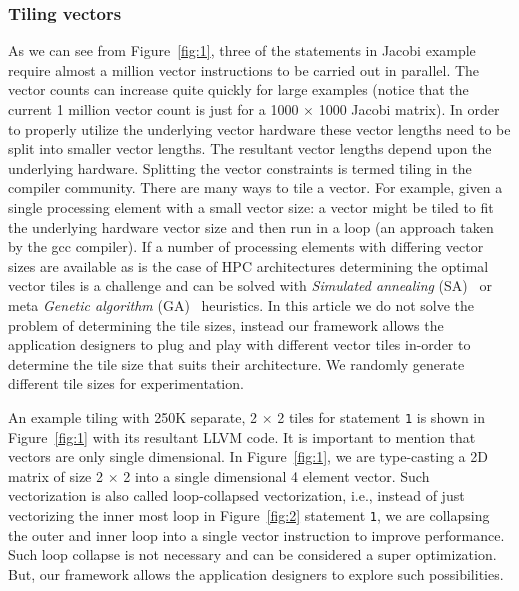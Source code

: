 \subsubsection{Tiling vectors}
\label{sec:tiling-vector-counts}

As we can see from Figure~\ref{fig:1}, three of the statements in Jacobi
example require almost a million vector instructions to be carried out
in parallel. The vector counts can increase quite quickly for large
examples (notice that the current 1 million vector count is just for a
1000 $\times$ 1000 Jacobi matrix). In order to properly utilize the
underlying vector hardware these vector lengths need to be split into
smaller vector lengths. The resultant vector lengths depend upon the
underlying hardware. Splitting the vector constraints is termed tiling
in the compiler community. There are many ways to tile a vector. For
example, given a single processing element with a small vector size: a
vector might be tiled to fit the underlying hardware vector size and
then run in a loop (an approach taken by the gcc compiler). If a number
of processing elements with differing vector sizes are available as is
the case of HPC architectures determining the optimal vector tiles is a
challenge and can be solved with \textit{Simulated annealing}
(SA)~\cite{tbra01} or meta \textit{Genetic algorithm} (GA)~\cite{tbra01}
heuristics. In this article we do not solve the problem of determining
the tile sizes, instead our framework allows the application designers
to plug and play with different vector tiles in-order to determine the
tile size that suits their architecture. We randomly generate different
tile sizes for experimentation.

An example tiling with 250K separate, 2 $\times$ 2 tiles for statement
\texttt{1} is shown in Figure~\ref{fig:1} with its resultant LLVM
code. It is important to mention that vectors are only single
dimensional. In Figure~\ref{fig:1}, we are type-casting a 2D matrix of
size 2 $\times$ 2 into a single dimensional 4 element vector. Such
vectorization is also called loop-collapsed vectorization, i.e., instead
of just vectorizing the inner most loop in Figure~\ref{fig:2} statement
\texttt{1}, we are collapsing the outer and inner loop into a single
vector instruction to improve performance. Such loop collapse is not
necessary and can be considered a super optimization. But, our framework
allows the application designers to explore such possibilities.



